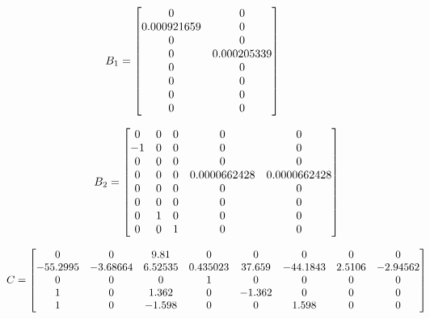 \documentclass[]{report}
\begin{document}
\begin{minipage}{0.45\textwidth}
	\[
	\hspace{-2cm}
	B_1 =
	\begin{bmatrix}
		0 & 0 \\
		0.000921659 & 0 \\
		0 & 0 \\
		0 & 0.000205339 \\
		0 & 0 \\
		0 & 0 \\
		0 & 0 \\
		0 & 0
	\end{bmatrix}
	\]
\end{minipage}
\noindent
\begin{minipage}{0.45\textwidth}
	\[
	\hspace{-0.5cm}
	B_2 =
	\begin{bmatrix}
		0 & 0 & 0 & 0 & 0 \\
		-1 & 0 & 0 & 0 & 0 \\
		0 & 0 & 0 & 0 & 0 \\
		0 & 0 & 0 & 0.0000662428 & 0.0000662428 \\
		0 & 0 & 0 & 0 & 0 \\
		0 & 0 & 0 & 0 & 0 \\
		0 & 1 & 0 & 0 & 0 \\
		0 & 0 & 1 & 0 & 0
	\end{bmatrix}
	\]
\end{minipage}

\[
\hspace{-0.5cm}
C =
\begin{bmatrix}
	0 & 0 & 9.81 & 0 & 0 & 0 & 0 & 0 \\
	-55.2995 & -3.68664 & 6.52535 & 0.435023 & 37.659 & -44.1843 & 2.5106 & -2.94562 \\
	0 & 0 & 0 & 1 & 0 & 0 & 0 & 0 \\
	1 & 0 & 1.362 & 0 & -1.362 & 0 & 0 & 0 \\
	1 & 0 & -1.598 & 0 & 0 & 1.598 & 0 & 0
\end{bmatrix}
\]
\end{document}
